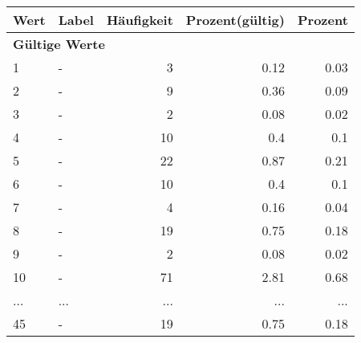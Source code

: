      \begin{longtable}{lXrrr}
     \toprule
     \textbf{Wert} & \textbf{Label} & \textbf{Häufigkeit} & \textbf{Prozent(gültig)} & \textbf{Prozent} \\
     \endhead
     \midrule
     \multicolumn{5}{l}{\textbf{Gültige Werte}}\\
        1 & \multicolumn{1}{X}{-} & %
          \num{3} &
          \num[round-mode=places,round-precision=2]{0,12} &
          \num[round-mode=places,round-precision=2]{0,03} \\
        2 & \multicolumn{1}{X}{-} & %
          \num{9} &
          \num[round-mode=places,round-precision=2]{0,36} &
          \num[round-mode=places,round-precision=2]{0,09} \\
        3 & \multicolumn{1}{X}{-} & %
          \num{2} &
          \num[round-mode=places,round-precision=2]{0,08} &
          \num[round-mode=places,round-precision=2]{0,02} \\
        4 & \multicolumn{1}{X}{-} & %
          \num{10} &
          \num[round-mode=places,round-precision=2]{0,4} &
          \num[round-mode=places,round-precision=2]{0,1} \\
        5 & \multicolumn{1}{X}{-} & %
          \num{22} &
          \num[round-mode=places,round-precision=2]{0,87} &
          \num[round-mode=places,round-precision=2]{0,21} \\
        6 & \multicolumn{1}{X}{-} & %
          \num{10} &
          \num[round-mode=places,round-precision=2]{0,4} &
          \num[round-mode=places,round-precision=2]{0,1} \\
        7 & \multicolumn{1}{X}{-} & %
          \num{4} &
          \num[round-mode=places,round-precision=2]{0,16} &
          \num[round-mode=places,round-precision=2]{0,04} \\
        8 & \multicolumn{1}{X}{-} & %
          \num{19} &
          \num[round-mode=places,round-precision=2]{0,75} &
          \num[round-mode=places,round-precision=2]{0,18} \\
        9 & \multicolumn{1}{X}{-} & %
          \num{2} &
          \num[round-mode=places,round-precision=2]{0,08} &
          \num[round-mode=places,round-precision=2]{0,02} \\
        10 & \multicolumn{1}{X}{-} & %
          \num{71} &
          \num[round-mode=places,round-precision=2]{2,81} &
          \num[round-mode=places,round-precision=2]{0,68} \\
       ... & ... & ... & ... & ... \\
        45 & \multicolumn{1}{X}{-} & %
          \num{19} &
          \num[round-mode=places,round-precision=2]{0,75} &
          \num[round-mode=places,round-precision=2]{0,18} \\


\end{longtable}

